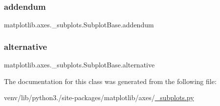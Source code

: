 \subsubsection{\texorpdfstring{addendum}{addendum}}
{\footnotesize\ttfamily matplotlib.\+axes.\+\_\+subplots.\+Subplot\+Base.\+addendum\hspace{0.3cm}{\ttfamily [static]}}

\mbox{\label{classmatplotlib_1_1axes_1_1__subplots_1_1SubplotBase_aab127e4d91d5a1aaab5af6995de63dae}} 
\subsubsection{\texorpdfstring{alternative}{alternative}}
{\footnotesize\ttfamily matplotlib.\+axes.\+\_\+subplots.\+Subplot\+Base.\+alternative\hspace{0.3cm}{\ttfamily [static]}}



The documentation for this class was generated from the following file\+:\begin{DoxyCompactItemize}
\item 
venv/lib/python3./site-\/packages/matplotlib/axes/\hyperlink{__subplots_8py}{\+\_\+subplots.\+py}\end{DoxyCompactItemize}

